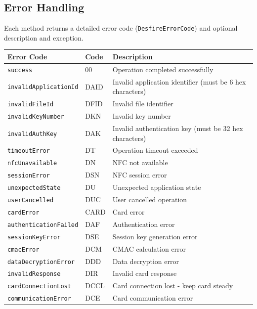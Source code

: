 \documentclass[a4paper,12pt]{article}
\begin{document}
\newpage

\subsection{Error Handling}
Each method returns a detailed error code (\texttt{DesfireErrorCode}) and optional description and exception.

\begin{table}[h!]
\centering
\begin{tabular}{|l|l|p{6cm}|}
\hline
\textbf{Error Code} & \textbf{Code} & \textbf{Description} \\
\hline
\texttt{success} & 00 & Operation completed successfully \\
\hline
\texttt{invalidApplicationId} & DAID & Invalid application identifier (must be 6 hex characters) \\
\hline
\texttt{invalidFileId} & DFID & Invalid file identifier \\
\hline
\texttt{invalidKeyNumber} & DKN & Invalid key number \\
\hline
\texttt{invalidAuthKey} & DAK & Invalid authentication key (must be 32 hex characters) \\
\hline
\texttt{timeoutError} & DT & Operation timeout exceeded \\
\hline
\texttt{nfcUnavailable} & DN & NFC not available \\
\hline
\texttt{sessionError} & DSN & NFC session error \\
\hline
\texttt{unexpectedState} & DU & Unexpected application state \\
\hline
\texttt{userCancelled} & DUC & User cancelled operation \\
\hline
\texttt{cardError} & CARD & Card error \\
\hline
\texttt{authenticationFailed} & DAF & Authentication error \\
\hline
\texttt{sessionKeyError} & DSE & Session key generation error \\
\hline
\texttt{cmacError} & DCM & CMAC calculation error \\
\hline
\texttt{dataDecryptionError} & DDD & Data decryption error \\
\hline
\texttt{invalidResponse} & DIR & Invalid card response \\
\hline
\texttt{cardConnectionLost} & DCCL & Card connection lost - keep card steady \\
\hline
\texttt{communicationError} & DCE & Card communication error \\

\end{tabular}
\end{table}
\end{document}
